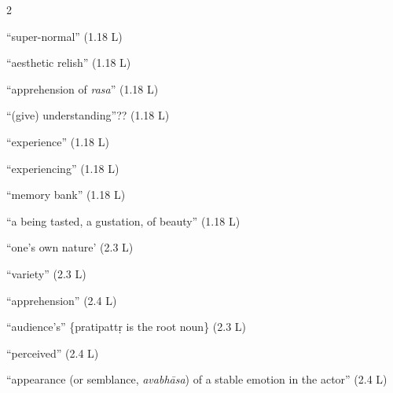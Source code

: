 \documentclass[10pt]{article}
\begin{document}
\begin{multicols}{2}
\begin{enumerate}[
			leftmargin=0em,
			rightmargin=0em,
		]


		 ``super-normal'' (1.18 L)

		 ``aesthetic relish'' (1.18 L)

		 ``apprehension of \textit{rasa}'' (1.18 L)

		 ``(give) understanding''?? (1.18 L)

		 ``experience'' (1.18 L)

		 ``experiencing'' (1.18 L)

		 ``memory bank'' (1.18 L)

		 ``a being tasted, a gustation, of beauty'' (1.18 L)

		 ``one's own nature' (2.3 L)

		 ``variety'' (2.3 L)

		 ``apprehension'' (2.4 L)

		 ``audience's'' \{pratipattṛ is the root noun\} (2.3 L)


		 ``perceived'' (2.4 L)


		 ``appearance (or semblance, \textit{avabhāsa}) of a stable emotion in the actor'' (2.4 L)


\end{enumerate}
\end{multicols}
\end{document}
